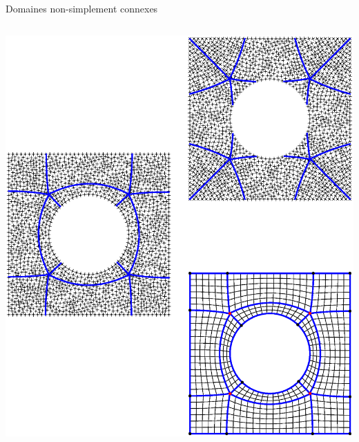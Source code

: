 \documentclass[compress,10pt,aspectratio=169]{beamer}
\begin{document}
\begin{frame}{Domaines non-simplement connexes}
\begin{columns}
\begin{column}{0.32\textwidth}
\includegraphics[scale=0.27]{images/image.eps}
\end{column}
\end{columns}
\end{frame}
\end{document}

